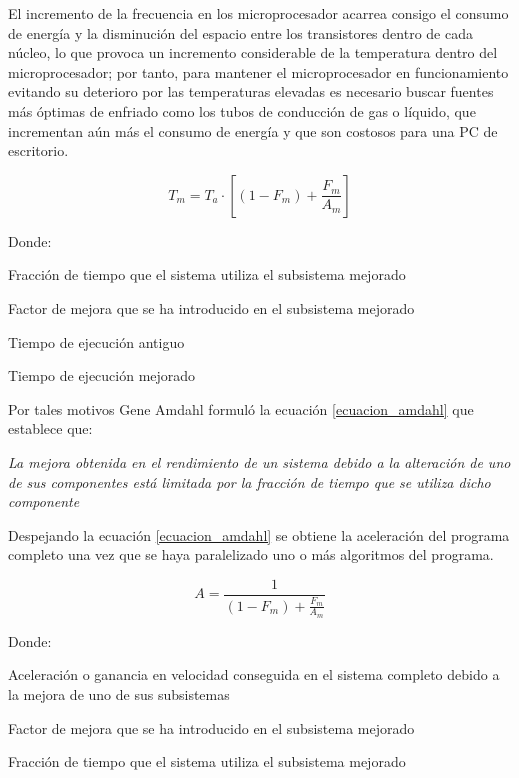 \documentclass[../main/main.tex]{subfiles}
\begin{document}
  El incremento de la frecuencia en los microprocesador acarrea consigo el consumo de energía y la disminución del espacio entre los transistores dentro de cada núcleo, lo que provoca un incremento considerable de la temperatura dentro del microprocesador; por tanto, para mantener el microprocesador en funcionamiento evitando su deterioro por las temperaturas elevadas es necesario buscar fuentes más óptimas de enfriado como los tubos de conducción de gas o líquido, que incrementan aún más el consumo de energía y que son costosos para una PC de escritorio.

  \vspace{-0.7cm}\begin{equation}
    T_m = T_a \cdot [( 1 - F_m ) + \frac{F_m}{A_m}]
    \label{ecuacion_amdahl}
  \end{equation}

  Donde:

  \begin{description}
    \item[$F_m=$] Fracción de tiempo que el sistema utiliza el subsistema mejorado
    \item[$A_m=$] Factor de mejora que se ha introducido en el subsistema mejorado
    \item[$T_a=$] Tiempo de ejecución antiguo
    \item[$T_m=$] Tiempo de ejecución mejorado
  \end{description}

  Por tales motivos Gene Amdahl formuló la ecuación \ref{ecuacion_amdahl} que establece que:

  \textit{La mejora obtenida en el rendimiento de un sistema debido a la alteración de uno de sus componentes está limitada por la fracción de tiempo que se utiliza dicho componente}

  Despejando la ecuación \ref{ecuacion_amdahl} se obtiene la aceleración del programa completo una vez que se haya paralelizado uno o más algoritmos del programa.

  \vspace{-0.7cm}\begin{equation}
    A = \frac{1}{( 1 - F_m ) + \frac{F_m}{A_m}}
    \label{ecuacion_amdahl_aceleracion}
  \end{equation}

  Donde:

  \begin{description}
    \item[$A=$] Aceleración o ganancia en velocidad conseguida en el sistema completo debido a la mejora de uno de sus subsistemas
    \item[$A_m=$] Factor de mejora que se ha introducido en el subsistema mejorado
    \item[$F_m=$] Fracción de tiempo que el sistema utiliza el subsistema mejorado
  \end{description}
\end{document}
